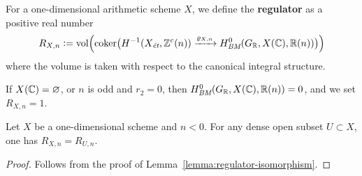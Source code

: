 \documentclass[draft]{article}
\numberwithin{equation}{section}
\begin{document}
\begin{definition}
  \label{dfn:regulator}
  For a one-dimensional arithmetic scheme $X$, we define the \textbf{regulator}
  as a positive real number
  \[ R_{X,n} \dfn \vol \Bigl(\coker \bigl(
    H^{-1} (X_\et, \ZZ^c (n)) \xrightarrow{\varrho_{X,n}}
    H^0_\BM (G_\RR, X(\CC), \RR(n))
    \bigr)\Bigr) \]
  where the volume is taken with respect to the canonical integral structure.
\end{definition}

If $X(\CC) = \emptyset$, or $n$ is odd and $r_2 = 0$, then
$H^0_\BM (G_\RR, X(\CC), \RR (n)) = 0$, and we set $R_{X,n} = 1$.

\begin{lemma}
  \label{lemma:regulator-dense-open-subset}
  Let $X$ be a one-dimensional scheme and $n < 0$. For any dense open subset
  $U \subset X$, one has $R_{X,n} = R_{U,n}$.

  \begin{proof}
    Follows from the proof of Lemma~\ref{lemma:regulator-isomorphism}.
  \end{proof}
\end{lemma}
\end{document}
